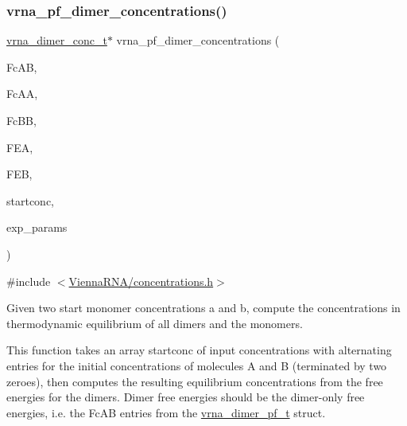 \subsubsection{\texorpdfstring{vrna\+\_\+pf\+\_\+dimer\+\_\+concentrations()}{vrna\_pf\_dimer\_concentrations()}}
{\footnotesize\ttfamily \mbox{\hyperlink{group__pf__cofold_gac48c2723444ecfdceafcfd525ca98322}{vrna\+\_\+dimer\+\_\+conc\+\_\+t}}$\ast$ vrna\+\_\+pf\+\_\+dimer\+\_\+concentrations (\begin{DoxyParamCaption}\item[{double}]{Fc\+AB,  }\item[{double}]{Fc\+AA,  }\item[{double}]{Fc\+BB,  }\item[{double}]{F\+EA,  }\item[{double}]{F\+EB,  }\item[{const double $\ast$}]{startconc,  }\item[{const \mbox{\hyperlink{group__energy__parameters_ga01d8b92fe734df8d79a6169482c7d8d8}{vrna\+\_\+exp\+\_\+param\+\_\+t}} $\ast$}]{exp\+\_\+params }\end{DoxyParamCaption})}



{\ttfamily \#include $<$\mbox{\hyperlink{concentrations_8h}{Vienna\+R\+N\+A/concentrations.\+h}}$>$}



Given two start monomer concentrations a and b, compute the concentrations in thermodynamic equilibrium of all dimers and the monomers. 

This function takes an array \textquotesingle{}startconc\textquotesingle{} of input concentrations with alternating entries for the initial concentrations of molecules A and B (terminated by two zeroes), then computes the resulting equilibrium concentrations from the free energies for the dimers. Dimer free energies should be the dimer-\/only free energies, i.\+e. the Fc\+AB entries from the \mbox{\hyperlink{group__pf__cofold_ga444df1587c9a2ca15b8eb25188f629c3}{vrna\+\_\+dimer\+\_\+pf\+\_\+t}} struct.


